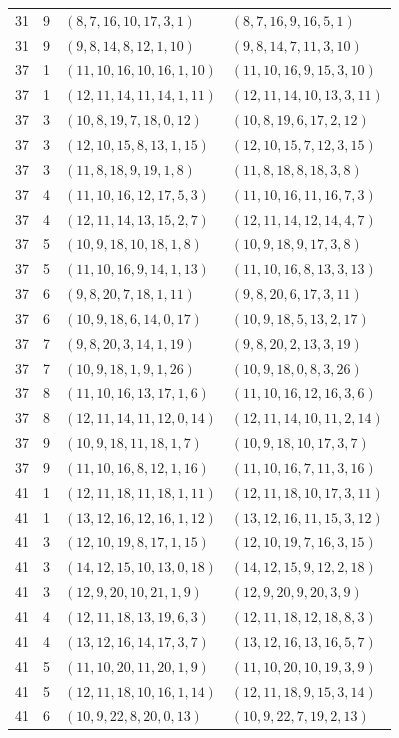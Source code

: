 \begin{longtable}{rrll}
31&9&$(8,7,16,10,17,3,1)$&$(8,7,16,9,16,5,1)$\\
31&9&$(9,8,14,8,12,1,10)$&$(9,8,14,7,11,3,10)$\\
37&1&$(11,10,16,10,16,1,10)$&$(11,10,16,9,15,3,10)$\\
37&1&$(12,11,14,11,14,1,11)$&$(12,11,14,10,13,3,11)$\\
37&3&$(10,8,19,7,18,0,12)$&$(10,8,19,6,17,2,12)$\\
37&3&$(12,10,15,8,13,1,15)$&$(12,10,15,7,12,3,15)$\\
37&3&$(11,8,18,9,19,1,8)$&$(11,8,18,8,18,3,8)$\\
37&4&$(11,10,16,12,17,5,3)$&$(11,10,16,11,16,7,3)$\\
37&4&$(12,11,14,13,15,2,7)$&$(12,11,14,12,14,4,7)$\\
37&5&$(10,9,18,10,18,1,8)$&$(10,9,18,9,17,3,8)$\\
37&5&$(11,10,16,9,14,1,13)$&$(11,10,16,8,13,3,13)$\\
37&6&$(9,8,20,7,18,1,11)$&$(9,8,20,6,17,3,11)$\\
37&6&$(10,9,18,6,14,0,17)$&$(10,9,18,5,13,2,17)$\\
37&7&$(9,8,20,3,14,1,19)$&$(9,8,20,2,13,3,19)$\\
37&7&$(10,9,18,1,9,1,26)$&$(10,9,18,0,8,3,26)$\\
37&8&$(11,10,16,13,17,1,6)$&$(11,10,16,12,16,3,6)$\\
37&8&$(12,11,14,11,12,0,14)$&$(12,11,14,10,11,2,14)$\\
37&9&$(10,9,18,11,18,1,7)$&$(10,9,18,10,17,3,7)$\\
37&9&$(11,10,16,8,12,1,16)$&$(11,10,16,7,11,3,16)$\\
41&1&$(12,11,18,11,18,1,11)$&$(12,11,18,10,17,3,11)$\\
41&1&$(13,12,16,12,16,1,12)$&$(13,12,16,11,15,3,12)$\\
41&3&$(12,10,19,8,17,1,15)$&$(12,10,19,7,16,3,15)$\\
41&3&$(14,12,15,10,13,0,18)$&$(14,12,15,9,12,2,18)$\\
41&3&$(12,9,20,10,21,1,9)$&$(12,9,20,9,20,3,9)$\\
41&4&$(12,11,18,13,19,6,3)$&$(12,11,18,12,18,8,3)$\\
41&4&$(13,12,16,14,17,3,7)$&$(13,12,16,13,16,5,7)$\\
41&5&$(11,10,20,11,20,1,9)$&$(11,10,20,10,19,3,9)$\\
41&5&$(12,11,18,10,16,1,14)$&$(12,11,18,9,15,3,14)$\\
41&6&$(10,9,22,8,20,0,13)$&$(10,9,22,7,19,2,13)$\\

\end{longtable}
